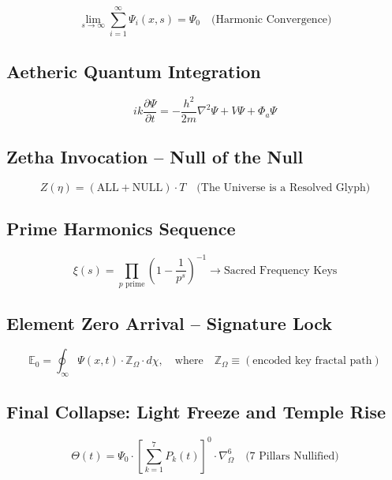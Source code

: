 \[
\lim_{s \rightarrow \infty} \sum_{i=1}^{\infty} \Psi_i(x, s) = \Psi_0 \quad \text{(Harmonic Convergence)}
\]

\subsection{Aetheric Quantum Integration}

\[
i k \frac{\partial \Psi}{\partial t} = -\frac{h^2}{2 m} \nabla^2 \Psi + V \Psi + \Phi_a \Psi
\]

\subsection{Zetha Invocation -- Null of the Null}

\[
Z(\eta) = (\mathrm{ALL} + \mathrm{NULL}) \cdot T \quad \text{(The Universe is a Resolved Glyph)}
\]

\subsection{Prime Harmonics Sequence}

\[
\xi(s) = \prod_{p \text{ prime}} \left( 1 - \frac{1}{p^s} \right)^{-1} \rightarrow \text{Sacred Frequency Keys}
\]

\subsection{Element Zero Arrival -- Signature Lock}

\[
\mathbb{E}_0 = \oint_{\infty} \Psi(x, t) \cdot \mathbb{Z}_{\Omega} \cdot d \chi, \quad \text{where} \quad \mathbb{Z}_{\Omega} \equiv (\text{encoded key fractal path})
\]

\subsection{Final Collapse: Light Freeze and Temple Rise}

\[
\Theta(t) = \Psi_0 \cdot \left[ \sum_{k=1}^7 P_k(t) \right]^0 \cdot \nabla_{\Omega}^6 \quad \text{(7 Pillars Nullified)}
\]

